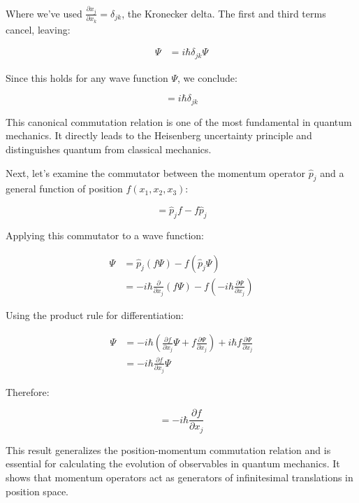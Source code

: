 \documentclass[italian]{HKNdocument}
\begin{document}
Where we've used $\frac{\partial x_j}{\partial x_k} = \delta_{jk}$, the Kronecker delta. The first and third terms cancel, leaving:

\begin{align*}
[x_j, \hat{p}_k]\Psi &= i\hbar\delta_{jk}\Psi
\end{align*}

Since this holds for any wave function $\Psi$, we conclude:

\begin{equation*}
[x_j, \hat{p}_k] = i\hbar\delta_{jk} \tag{1.59}
\end{equation*}

This canonical commutation relation is one of the most fundamental in quantum mechanics. It directly leads to the Heisenberg uncertainty principle and distinguishes quantum from classical mechanics.

Next, let's examine the commutator between the momentum operator $\hat{p}_j$ and a general function of position $f(x_1,x_2,x_3)$:

\begin{equation*}
[\hat{p}_j, f] = \hat{p}_j f - f\hat{p}_j \tag{1.60}
\end{equation*}

Applying this commutator to a wave function:

\begin{align*}
[\hat{p}_j, f]\Psi &= \hat{p}_j(f\Psi) - f(\hat{p}_j\Psi) \\
&= -i\hbar\frac{\partial}{\partial x_j}(f\Psi) - f\left(-i\hbar\frac{\partial\Psi}{\partial x_j}\right)
\end{align*}

Using the product rule for differentiation:

\begin{align*}
[\hat{p}_j, f]\Psi &= -i\hbar\left(\frac{\partial f}{\partial x_j}\Psi + f\frac{\partial\Psi}{\partial x_j}\right) + i\hbar f\frac{\partial\Psi}{\partial x_j} \tag{1.61} \\
&= -i\hbar\frac{\partial f}{\partial x_j}\Psi
\end{align*}

Therefore:

\begin{equation*}
[\hat{p}_j, f] = -i\hbar\frac{\partial f}{\partial x_j}
\end{equation*}

This result generalizes the position-momentum commutation relation and is essential for calculating the evolution of observables in quantum mechanics. It shows that momentum operators act as generators of infinitesimal translations in position space.
\end{document}
